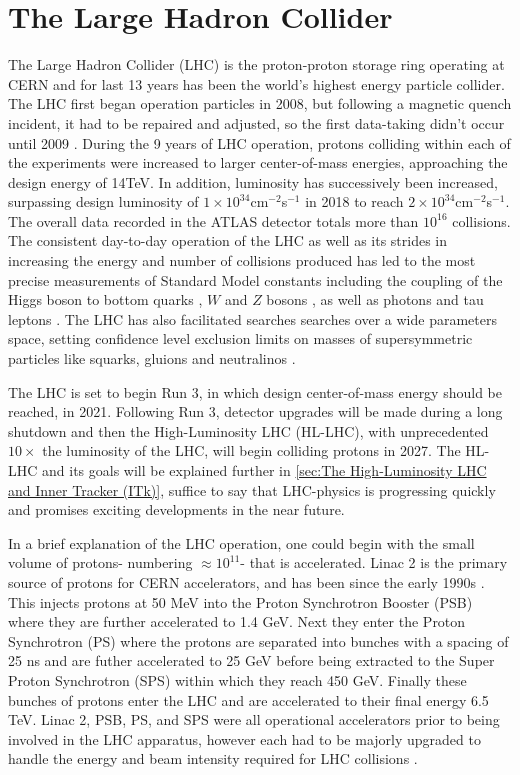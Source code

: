\section{The Large Hadron Collider}
The Large Hadron Collider (LHC) is the proton-proton storage ring operating at CERN and for last 13 years has been the world's highest energy particle collider. The LHC first began operation particles in 2008, but following a magnetic quench incident, it had to be repaired and adjusted, so the first data-taking didn't occur until 2009 \cite{Rossi_2010}. During the 9 years of LHC operation, protons colliding within each of the experiments were increased to larger center-of-mass energies, approaching the design energy of 14TeV. In addition, luminosity has successively been increased, surpassing design luminosity of $1\times10^{34}$cm$^{-2}$s$^{-1}$ in 2018 to reach $2\times10^{34}$cm$^{-2}$s$^{-1}$\cite{CERNnews1}. The overall data recorded in the ATLAS detector totals more than $10^{16}$ collisions. The consistent day-to-day operation of the LHC as well as its strides in increasing the energy and number of collisions produced has led to the most precise measurements of Standard Model constants including the coupling of the Higgs boson to bottom quarks \cite{Aabout_2018_0}, $W$ and $Z$ bosons \cite{Aaboud_2019}, \cite{Aaboud_2018} as well as photons\cite{Aaboud_2018_2} and tau leptons \cite{Aaboud_2019_2}. The LHC has also facilitated searches searches over a wide parameters space, setting confidence level exclusion limits on masses of supersymmetric particles like squarks, gluions and neutralinos \cite{ATLAS-CONF-2019-040}. 

The LHC is set to begin Run 3, in which design center-of-mass energy should be reached, in 2021. Following Run 3, detector upgrades will be made during a long shutdown and then the High-Luminosity LHC (HL-LHC), with unprecedented $10\times$ the luminosity of the LHC, will begin colliding protons in 2027\cite{CERNnews2}. The HL-LHC and its goals will be explained further in \ref{sec:The High-Luminosity LHC and Inner Tracker (ITk)}, suffice to say that LHC-physics is progressing quickly and promises exciting developments in the near future. 

In a brief explanation of the LHC operation, one could begin with the small volume of protons- numbering $\approx 10^{11}$- that is accelerated. Linac 2 is the primary source of protons for CERN accelerators, and has been since the early 1990s \cite{LHCInjector}. This injects protons at 50 MeV into the Proton Synchrotron Booster (PSB) where they are further accelerated to 1.4 GeV. Next they enter the Proton Synchrotron (PS) where the protons are separated into bunches with a spacing of 25 ns and are futher accelerated to 25 GeV before being extracted to the Super Proton Synchrotron (SPS) within which they reach 450 GeV. Finally these bunches of protons enter the LHC and are accelerated to their final energy 6.5 TeV. Linac 2, PSB, PS, and SPS were all operational accelerators prior to being involved in the LHC apparatus, however each had to be majorly upgraded to handle the energy and beam intensity required for LHC collisions \cite{LHCInjector}. 

